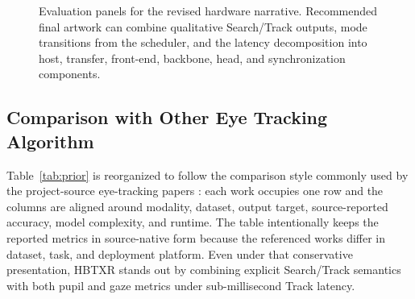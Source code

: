 \documentclass[journal]{IEEEtran}
\newcommand{\placeholderfigure}[2]{%
  \fbox{\parbox[c][#2][c]{#1}{\centering\vspace{2mm}\textbf{Figure placeholder}\\Final artwork pending\vspace{2mm}}}}
\begin{document}
\begin{figure}[t]
\centering
\placeholderfigure{0.93\textwidth}{1.9in}
\caption{Evaluation panels for the revised hardware narrative. Recommended final artwork can combine qualitative Search/Track outputs, mode transitions from the scheduler, and the latency decomposition into host, transfer, front-end, backbone, head, and synchronization components.}
\label{fig:eval_panels}
\end{figure}

\subsection{Comparison with Other Eye Tracking Algorithm}
Table~\ref{tab:prior} is reorganized to follow the comparison style commonly used by the project-source eye-tracking papers \cite{ref5,ref6,ref7,ref8,ref9,ref10}: each work occupies one row and the columns are aligned around modality, dataset, output target, source-reported accuracy, model complexity, and runtime. The table intentionally keeps the reported metrics in source-native form because the referenced works differ in dataset, task, and deployment platform. Even under that conservative presentation, HBTXR stands out by combining explicit Search/Track semantics with both pupil and gaze metrics under sub-millisecond Track latency.

\begin{table}[t]
\caption{Source-Aligned Comparison with Representative Eye-Tracking Algorithms}
\label{tab:prior}
\centering
\scriptsize
{\setlength{\tabcolsep}{3pt}
}
\end{table}
\end{document}
